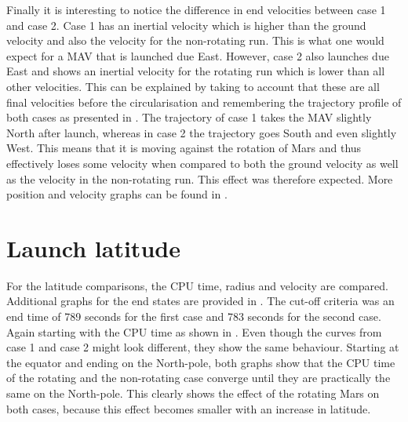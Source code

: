 \noindent
Finally it is interesting to notice the difference in end velocities between case 1 and case 2. Case 1 has an inertial velocity which is higher than the ground velocity and also the velocity for the non-rotating run. This is what one would expect for a \ac{MAV} that is launched due East. However, case 2 also launches due East and shows an inertial velocity for the rotating run which is lower than all other velocities. This can be explained by taking to account that these are all final velocities before the circularisation and remembering the trajectory profile of both cases as presented in . The trajectory of case 1 takes the \ac{MAV} slightly North after launch, whereas in case 2 the trajectory goes South and even slightly West. This means that it is moving against the rotation of Mars and thus effectively loses some velocity when compared to both the ground velocity as well as the velocity in the non-rotating run. This effect was therefore expected.
More position and velocity graphs can be found in .

%





\section{Launch latitude}
\label{sec:launchLatitude}
For the latitude comparisons, the CPU time, radius and velocity are compared. Additional graphs for the end states are provided in . The cut-off criteria was an end time of 789 seconds for the first case and 783 seconds for the second case. Again starting with the CPU time as shown in . Even though the curves from case 1 and case 2 might look different, they show the same behaviour. Starting at the equator and ending on the North-pole, both graphs show that the CPU time of the rotating and the non-rotating case converge until they are practically the same on the North-pole. This clearly shows the effect of the rotating Mars on both cases, because this effect becomes smaller with an increase in latitude.



